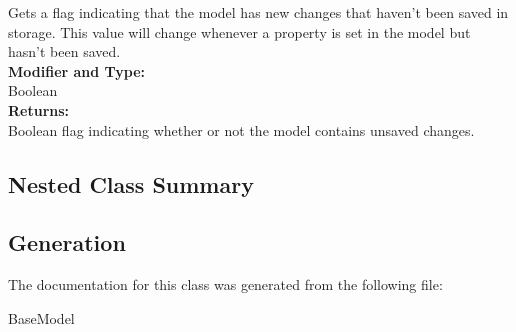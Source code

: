 Gets a flag indicating that the model has new changes that haven't been saved in storage. This value will change whenever a property is set in the model but hasn't been saved.\\

\textbf{Modifier and Type:}\\
\tab Boolean\\

\textbf{Returns:}\\
\tab Boolean flag indicating whether or not the model contains unsaved changes.

\subsection{Nested Class Summary}
\begin{DoxyCompactList}
\item{}
\item{}
\end{DoxyCompactList}



\subsection{Generation}
The documentation for this class was generated from the following file\-:
\begin{DoxyCompactItemize}
\item BaseModel
\end{DoxyCompactItemize} 









